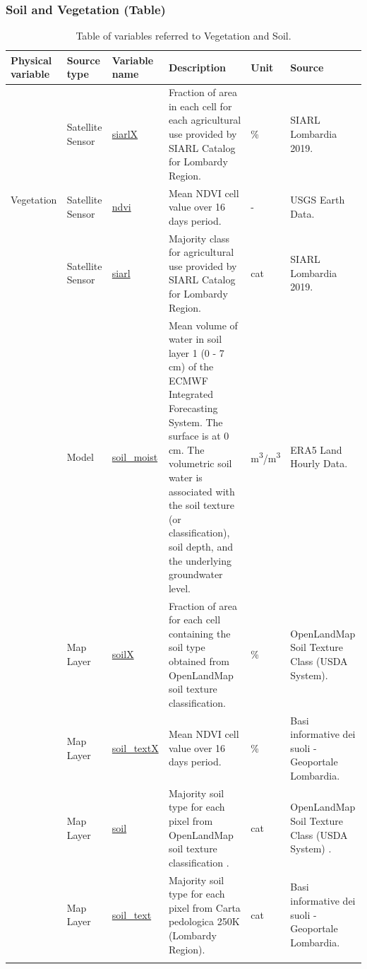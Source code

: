 \subsubsection{Soil and Vegetation (Table)}

\begin{center}
\setlength{\arrayrulewidth}{1.5pt}
\begin{longtable}{ |p{2.3cm}|p{1.5cm}|p{2.3cm}|p{4cm}|p{1cm}|p{2.5cm}| } 
\hline
\textbf{Physical variable} & \textbf{Source type}  & \textbf{Variable name}  & \textbf{Description}  & \textbf{Unit}  & \textbf{Source}\\ 
\hline

\multirow{3}{4em}{Vegetation} & Satellite \newline Sensor  & \underline{siarlX} & Fraction of area in each cell for each agricultural use provided by SIARL Catalog for Lombardy Region.\par & \% & SIARL Lombardia 2019.\\ 
& Satellite \newline Sensor  & \underline{ndvi} &  Mean NDVI cell value over 16 days period.\par & - & USGS Earth Data.\\ 
& Satellite \newline Sensor  & \underline{siarl} &  Majority class for agricultural use provided by SIARL Catalog for Lombardy Region. \par & cat & SIARL Lombardia 2019.\\
\hline
\pagebreak
\hline
\multirow{5}{4em}{Soil} & Model  & \underline{soil\_moist} & Mean volume of water in soil layer 1 (0 - 7 cm) of the ECMWF Integrated Forecasting System. The surface is at 0 cm. The volumetric soil water is associated with the soil texture (or classification), soil depth, and the underlying groundwater level.\par & m\textsuperscript{3}/m\textsuperscript{3} & ERA5 Land Hourly Data.\\ 
& Map Layer  & \underline{soilX} &  Fraction of area for each cell containing the soil type obtained from OpenLandMap soil texture classification.\par & \% & OpenLandMap Soil Texture Class (USDA System).\\ 
& Map Layer  & \underline{soil\_textX} &  Mean NDVI cell value over 16 days period. \par & \% & Basi informative dei suoli - Geoportale Lombardia.\\ 
& Map Layer  & \underline{soil} &  Majority soil type for each pixel from OpenLandMap soil texture classification .\par & cat & OpenLandMap Soil Texture Class (USDA System) .\\ 
& Map Layer  & \underline{soil\_text} &  Majority soil type for each pixel from Carta pedologica 250K (Lombardy Region). \par& cat & Basi informative dei suoli - Geoportale Lombardia.\\ 

\hline
\caption{Table of variables referred to Vegetation and Soil.}

\end{longtable}
\end{center}

